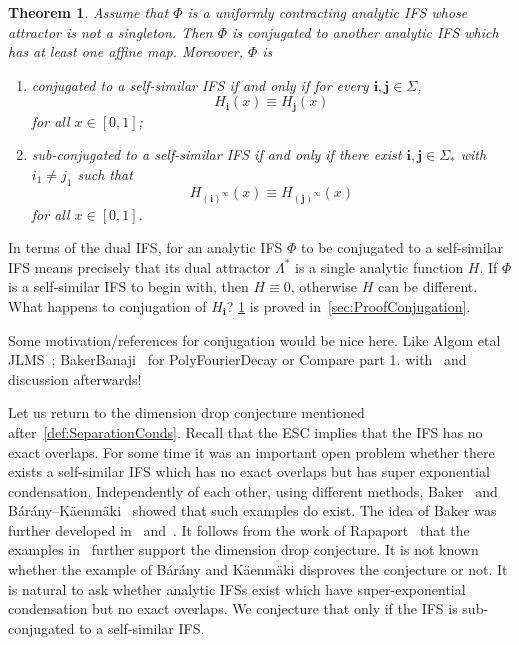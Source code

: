 \documentclass[12pt,]{article}
\newtheorem{theorem}{Theorem}[section]
\theoremstyle{definition}
\theoremstyle{remark}
\newcommand{\0}{\mathbf{0}}
\newcommand{\bi}{\mathbf{i}}
\newcommand{\bj}{\mathbf{j}}
\begin{document}
{\begin{theorem}\label{thm:SubConjugation}
Assume that $\Phi$ is a uniformly contracting analytic IFS whose attractor is not a singleton. Then $\Phi$ is conjugated to another analytic IFS which has at least one affine map. Moreover, $\Phi$ is 
\begin{enumerate}
\item conjugated to a self-similar IFS if and only if for every $\bi,\bj\in\Sigma$,
\[
H_{\bi}(x) \equiv H_{\bj}(x)
\]
for all $x\in[0,1]$;
\item sub-conjugated to a self-similar IFS if and only if there exist $\bi,\bj\in\Sigma_*$ with $i_1\neq j_1$ such that 
\[
H_{(\bi)^\infty}(x) \equiv H_{(\bj)^\infty}(x)
\]
for all $x\in[0,1]$.
\end{enumerate}
\end{theorem}

In terms of the dual IFS, for an analytic IFS $\Phi$ to be conjugated to a self-similar IFS means precisely that its dual attractor $\Lambda^*$ is a single analytic function $H$. If $\Phi$ is a self-similar IFS to begin with, then $H\equiv 0$, otherwise $H$ can be different. {\color{red} What happens to conjugation of $H_{\bi}$?} \cref{thm:SubConjugation} is proved in~\cref{sec:ProofConjugation}.

{\color{red} Some motivation/references for conjugation would be nice here. Like Algom etal JLMS~\cite{AlgomEtal_LogFourierDecaySelfConf_JLMS}; BakerBanaji~\cite{BakerBanaji_PolyFourierDecay} for PolyFourierDecay or Compare part 1. with~\cite[Corollary 1.2 part 3.]{AlgomEtal_PointwiseNormalityFDecaySelfSonf_AdvMath21} and discussion afterwards!}

Let us return to the dimension drop conjecture mentioned after~\cref{def:SeparationConds}. Recall that the ESC implies that the IFS has no exact overlaps. For some time it was an important open problem whether there exists a self-similar IFS which has no exact overlaps but has super exponential condensation. Independently of each other, using different methods, Baker~\cite{Baker_SuperExpCloseIFS_AdvMath} and B\'ar\'any--K\"{a}enm\"{a}ki~\cite{BaranyKaenmaki_SuperExpCLoseIFS} showed that such examples do exist. The idea of Baker was further developed in~\cite{Baker_SuperExpCloseIFS2_ProcAMS} and~\cite{Chen_SuperExpNoExactOVerlapExample}. It follows from the work of Rapaport~\cite{Rapaport_ExactOverlapsAlgebraicContr} that the examples in~\cite{Baker_SuperExpCloseIFS_AdvMath, Baker_SuperExpCloseIFS2_ProcAMS, Chen_SuperExpNoExactOVerlapExample} further support the dimension drop conjecture. It is not known whether the example of B\'ar\'any and K\"{a}enm\"{a}ki disproves the conjecture or not. It is natural to ask whether analytic IFSs exist which have super-exponential condensation but no exact overlaps. We conjecture that only if the IFS is sub-conjugated to a self-similar IFS.

}
\end{document}
